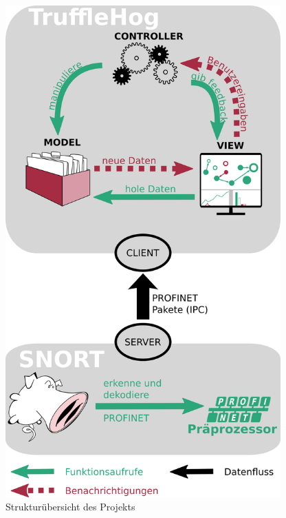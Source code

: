\begin{figure}[h]
  \centering
  \includegraphics[width=300pt]{../diagrams/intro_diagram/intro_diagram.png}
  \caption[Strukturübersicht des Projekts]{Strukturübersicht des Projekts}\label{fig:diagram}
\end{figure} 